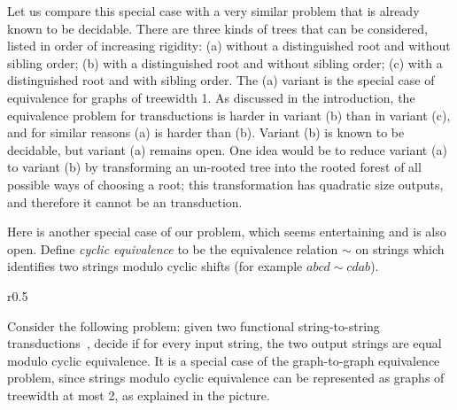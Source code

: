     Let us compare this special case with a very similar problem that is already known to be decidable. There are three kinds of trees that can be considered, listed in order of increasing rigidity: (a) without a distinguished root and without sibling order; (b)  with a distinguished root and without sibling order; (c) with a distinguished root and with sibling order. The (a) variant is the special case of equivalence for graphs of treewidth 1.  As discussed in the introduction, the equivalence problem for \mso transductions is harder in  variant (b) than in variant (c), and for similar reasons (a) is harder than (b). Variant (b) is known to be decidable, but variant (a) remains open.  One idea would be to reduce variant (a) to variant (b) by transforming an  un-rooted tree into the rooted forest of all possible ways of choosing a root; this transformation has quadratic size outputs, and therefore it cannot be an \mso transduction.
    

     Here is another special case of our problem, which seems entertaining and is also open.
        Define \emph{cyclic equivalence} to be the equivalence relation $\sim$ on strings which identifies two strings modulo cyclic shifts (for example $abcd \sim cdab$).
         \begin{wrapfigure}{r}{0.5\textwidth}
         \end{wrapfigure}
         Consider the following  problem: given two functional string-to-string \mso transductions~\cite[Definition 1]{engelfrietMSODefinableString2001},
        decide if for every input string, the two output strings are equal  modulo cyclic equivalence. %
         It is a special case of the graph-to-graph equivalence problem, since  strings modulo cyclic equivalence  can be represented as graphs of treewidth at most 2, as explained in the  picture.


        